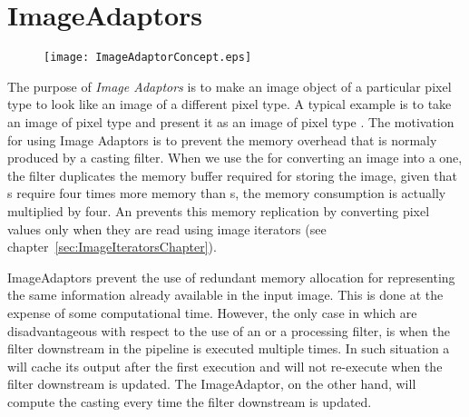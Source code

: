 
\chapter{ImageAdaptors}
\label{sec:ImageAdaptors}


\begin{figure}
\center
\texttt{[image: ImageAdaptorConcept.eps]}
\label{fig:ImageAdaptorConcept}
\end{figure}



The purpose of \emph{Image Adaptors} is to make an image object of a particular
pixel type to look like an image of a different pixel type. A typical example
is to take an image of pixel type  and present it as an
image of pixel type . The motivation for using Image Adaptors is to
prevent the memory overhead that is normaly produced by a casting filter.  When
we use the  for converting an 
image into a  one, the filter duplicates the memory buffer required
for storing the image, given that s require four times more memory
than s, the memory consumption is actually multiplied by
four.  An  prevents this memory replication by converting
pixel values only when they are read using image iterators (see
chapter~\ref{sec:ImageIteratorsChapter}).

ImageAdaptors prevent the use of redundant memory allocation for representing
the same information already available in the input image. This is done at the
expense of some computational time. However, the only case in which
 are disadvantageous with respect to the use of an
 or a processing filter, is when the filter downstream
in the pipeline is executed multiple times. In such situation a
 will cache its output after the first execution and will
not re-execute when the filter downstream is updated. The ImageAdaptor, on the
other hand, will compute the casting every time the filter downstream is
updated.

